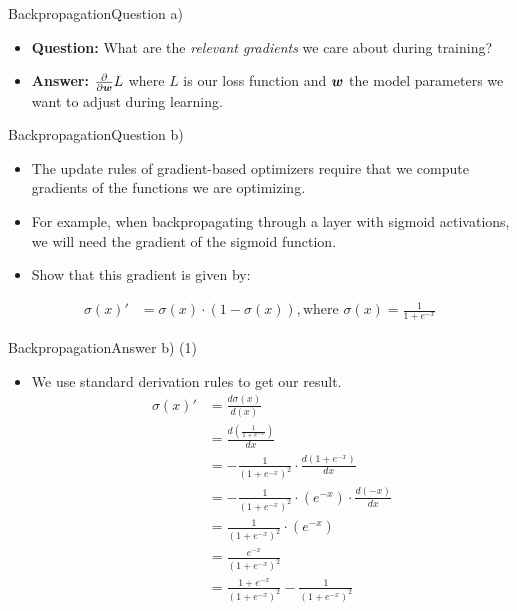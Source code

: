 \documentclass[t]{beamer}
\begin{document}
\begin{frame}{Backpropagation}{Question a)}
    \begin{itemize}
        \item {\textbf{Question:}} What are the \emph{relevant gradients} we
              care about during training?
              \pause
        \item \textbf{Answer:} $\frac{\partial}{\partial{\boldsymbol{w}}}L$ where $L$ is our
              loss function and ${\boldsymbol{w}}$ the model parameters we want to adjust
              during learning.
    \end{itemize}
\end{frame}

\begin{frame}{Backpropagation}{Question b)}
    \begin{itemize}
        \item The update rules of gradient-based optimizers require that we
              compute gradients of the functions we are optimizing.
        \item For example,
              when backpropagating through a layer with sigmoid activations, we
              will need the gradient of the sigmoid function.
        \item Show that this gradient is given by:
    \end{itemize}
    \begin{align*}
        \sigma(x)' & = \sigma(x) \cdot (1 - \sigma(x)), \text{where } \sigma(x) = \frac{1}{1 + e^{-x}}
    \end{align*}
\end{frame}

\begin{frame}{Backpropagation}{Answer b) (1)}
    \begin{itemize}
        \item We use standard derivation rules to get our result.
              \begin{align*}
                  \sigma(x)' & = \frac{d\sigma(x)}{d(x)}                                      \\
                             & = \frac{d(\frac{1}{1+e^{-x}})}{dx}                             \\
                             & = -\frac{1}{(1+e^{-x})^2}\cdot \frac{d(1+e^{-x})}{dx}          \\
                             & = -\frac{1}{(1+e^{-x})^2}\cdot (e^{-x}) \cdot \frac{d(-x)}{dx} \\
                             & = \frac{1}{(1+e^{-x})^2}\cdot (e^{-x})                         \\
                             & = \frac{e^{-x}}{(1+e^{-x})^2}                                  \\
                             & = \frac{1+e^{-x}}{(1+e^{-x})^2} - \frac{1}{(1+e^{-x})^2}       \\
              \end{align*}
    \end{itemize}
\end{frame}
\end{document}
